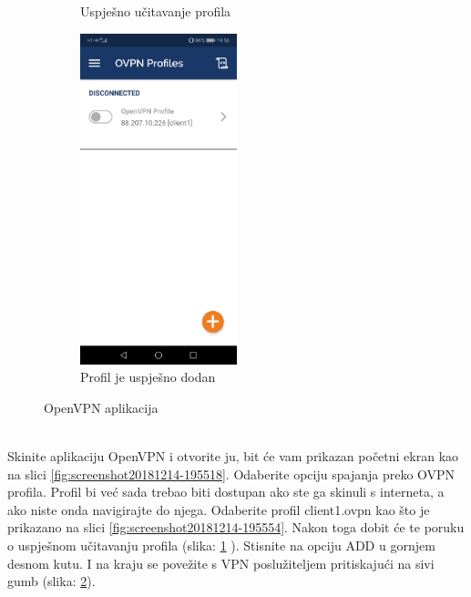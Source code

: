 \begin{figure}[h]
\begin{subfigure}{0.49\textwidth}
		\caption{Uspješno učitavanje profila}
		\label{fig:screenshot20181214-195602}
	\end{subfigure}
	\begin{subfigure}{0.49\textwidth}
		\centering
		\includegraphics[width = 0.5\textwidth]{slike/OpenVPN/Screenshot_20181214-195614}
		\caption{Profil je uspješno dodan}
		\label{fig:screenshot20181214-195614}
	\end{subfigure}
	\caption{OpenVPN aplikacija}
	\label{fig:combined}
\end{figure}
\\Skinite aplikaciju OpenVPN i otvorite ju, bit će vam prikazan početni ekran kao na slici \ref{fig:screenshot20181214-195518}. Odaberite opciju spajanja preko OVPN profila. Profil bi već sada trebao biti dostupan ako ste ga skinuli s interneta, a ako niste onda navigirajte do njega. Odaberite profil client1.ovpn kao što je prikazano na slici \ref{fig:screenshot20181214-195554}.
Nakon toga dobit će te poruku o uspješnom učitavanju profila (slika: \ref{fig:screenshot20181214-195602} ). Stisnite na opciju ADD u gornjem desnom kutu. I na kraju se povežite s VPN poslužiteljem pritiskajući na sivi gumb (slika: \ref{fig:screenshot20181214-195614}). 


